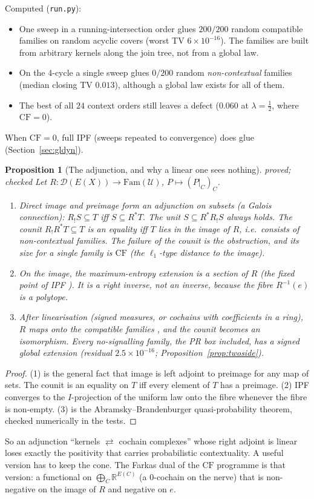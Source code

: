 \documentclass[11pt]{article}
\newtheorem{proposition}[theorem]{Proposition}
\theoremstyle{definition}
\theoremstyle{remark}
\newcommand{\CF}{\mathrm{CF}}
\newcommand{\st}[1]{\textsf{\small\color{gray}#1}}
\begin{document}
\noindent Computed (\texttt{run.py}):
\begin{itemize}
  \item One sweep in a running-intersection order glues $200/200$ random compatible families on random acyclic covers (worst TV $6\times10^{-16}$). The families are built from arbitrary kernels along the join tree, not from a global law.
  \item On the 4-cycle a single sweep glues $0/200$ random \emph{non-contextual} families (median closing TV $0.013$), although a global law exists for all of them.
  \item The best of all $24$ context orders still leaves a defect ($0.060$ at $\lambda=\tfrac12$, where $\CF=0$).
\end{itemize}
When $\CF=0$, full IPF (sweeps repeated to convergence) does glue (Section~\ref{sec:gldyn}).

\begin{proposition}[The adjunction, and why a linear one sees nothing]\label{prop:kerneladj}\st{proved; checked}
Let $R:\mathcal D(E(X))\to\mathrm{Fam}(\mathcal U)$, $P\mapsto(P|_C)_C$.
\begin{enumerate}
  \item Direct image and preimage form an adjunction on subsets (a Galois connection): $R_!S\subseteq T$ iff $S\subseteq R^\ast T$. The unit $S\subseteq R^\ast R_!S$ always holds. The counit $R_!R^\ast T\subseteq T$ is an equality iff $T$ lies in the image of $R$, i.e.\ consists of non-contextual families. The failure of the counit is the obstruction, and its size for a single family is $\CF$ (the $\ell_1$-type distance to the image).
  \item On the image, the maximum-entropy extension is a section of $R$ (the fixed point of IPF \cite{csiszar}). It is a right inverse, not an inverse, because the fibre $R^{-1}(e)$ is a polytope.
  \item After linearisation (signed measures, or cochains with coefficients in a ring), $R$ maps onto the compatible families \cite{ab11}, and the counit becomes an isomorphism. Every no-signalling family, the PR box included, has a signed global extension (residual $2.5\times10^{-16}$; Proposition~\ref{prop:twoside}).
\end{enumerate}
\end{proposition}
\begin{proof}
(1) is the general fact that image is left adjoint to preimage for any map of sets. The counit is an equality on $T$ iff every element of $T$ has a preimage. (2) IPF converges to the $I$-projection of the uniform law onto the fibre whenever the fibre is non-empty. (3) is the Abramsky--Brandenburger quasi-probability theorem, checked numerically in the tests.
\end{proof}
\noindent So an adjunction ``kernels $\rightleftarrows$ cochain complexes'' whose right adjoint is linear loses exactly the positivity that carries probabilistic contextuality. A useful version has to keep the cone. The Farkas dual of the $\CF$ programme is that version: a functional on $\bigoplus_C\mathbb R^{E(C)}$ (a $0$-cochain on the nerve) that is non-negative on the image of $R$ and negative on $e$.
\end{document}

